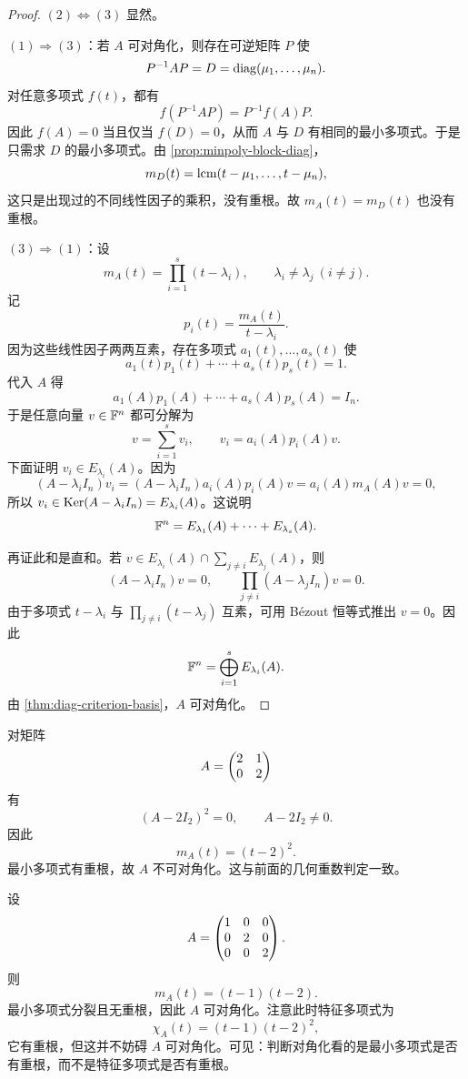 \begin{proof}
\((2)\Leftrightarrow(3)\) 显然。

\((1)\Rightarrow(3)\)：若 \(A\) 可对角化，则存在可逆矩阵 \(P\) 使
\[
P^{-1}AP=D=\mathrm{diag}(\mu_1,\dots,\mu_n).
\]
对任意多项式 \(f(t)\)，都有
\[
f(P^{-1}AP)=P^{-1}f(A)P.
\]
因此 \(f(A)=0\) 当且仅当 \(f(D)=0\)，从而 \(A\) 与 \(D\) 有相同的最小多项式。于是只需求 \(D\) 的最小多项式。由 \cref{prop:minpoly-block-diag}，
\[
m_D(t)=\operatorname{lcm}(t-\mu_1,\dots,t-\mu_n),
\]
这只是出现过的不同线性因子的乘积，没有重根。故 \(m_A(t)=m_D(t)\) 也没有重根。

\((3)\Rightarrow(1)\)：设
\[
m_A(t)=\prod_{i=1}^s (t-\lambda_i),
\qquad \lambda_i\neq \lambda_j\ (i\neq j).
\]
记
\[
p_i(t)=\frac{m_A(t)}{t-\lambda_i}.
\]
因为这些线性因子两两互素，存在多项式 \(a_1(t),\dots,a_s(t)\) 使
\[
a_1(t)p_1(t)+\cdots+a_s(t)p_s(t)=1.
\]
代入 \(A\) 得
\[
a_1(A)p_1(A)+\cdots+a_s(A)p_s(A)=I_n.
\]
于是任意向量 \(v\in \mathbb{F}^n\) 都可分解为
\[
v=\sum_{i=1}^s v_i,
\qquad v_i=a_i(A)p_i(A)v.
\]
下面证明 \(v_i\in E_{\lambda_i}(A)\)。因为
\[
(A-\lambda_i I_n)v_i=(A-\lambda_i I_n)a_i(A)p_i(A)v=a_i(A)m_A(A)v=0,
\]
所以 \(v_i\in \mathrm{Ker}(A-\lambda_i I_n)=E_{\lambda_i}(A)\)。这说明
\[
\mathbb{F}^n=E_{\lambda_1}(A)+\cdots+E_{\lambda_s}(A).
\]

再证此和是直和。若 \(v\in E_{\lambda_i}(A)\cap \sum_{j\ne i}E_{\lambda_j}(A)\)，则
\[
(A-\lambda_i I_n)v=0,
\qquad \prod_{j\ne i}(A-\lambda_j I_n)v=0.
\]
由于多项式 \(t-\lambda_i\) 与 \(\prod_{j\ne i}(t-\lambda_j)\) 互素，可用 Bézout 恒等式推出 \(v=0\)。因此
\[
\mathbb{F}^n=\bigoplus_{i=1}^s E_{\lambda_i}(A).
\]
由 \cref{thm:diag-criterion-basis}，\(A\) 可对角化。
\end{proof}

\begin{example}
对矩阵
\[
A=\begin{pmatrix} 2&1\\0&2 \end{pmatrix}
\]
有
\[
(A-2I_2)^2=0,
\qquad A-2I_2\neq 0.
\]
因此
\[
m_A(t)=(t-2)^2.
\]
最小多项式有重根，故 \(A\) 不可对角化。这与前面的几何重数判定一致。
\end{example}

\begin{example}
设
\[
A=\begin{pmatrix} 1&0&0\\0&2&0\\0&0&2 \end{pmatrix}.
\]
则
\[
m_A(t)=(t-1)(t-2).
\]
最小多项式分裂且无重根，因此 \(A\) 可对角化。注意此时特征多项式为
\[
\chi_A(t)=(t-1)(t-2)^2,
\]
它有重根，但这并不妨碍 \(A\) 可对角化。可见：判断对角化看的是最小多项式是否有重根，而不是特征多项式是否有重根。
\end{example}

